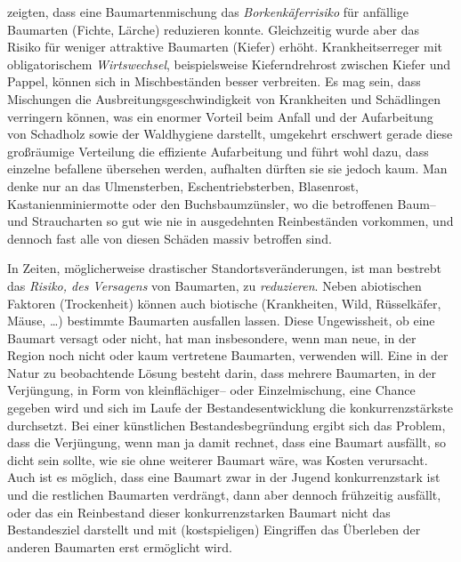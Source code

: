 \documentclass[twocolumn]{scrartcl}
\begin{document}
\cite{sylvie2021mischwaldInsekten} zeigten, dass eine
Baumartenmischung das \emph{Borkenkäferrisiko} für anfällige Baumarten
(Fichte, Lärche) reduzieren konnte. Gleichzeitig wurde aber das Risiko
für weniger attraktive Baumarten (Kiefer) erhöht. Krankheitserreger
mit obligatorischem \emph{Wirtswechsel}, beispielsweise
Kieferndrehrost zwischen Kiefer und Pappel, können sich in
Mischbeständen besser verbreiten. Es mag sein, dass Mischungen die Ausbreitungsgeschwindigkeit von Krankheiten und Schädlingen verringern können, was ein enormer Vorteil beim Anfall und der Aufarbeitung von Schadholz sowie der Waldhygiene darstellt, umgekehrt erschwert gerade diese großräumige Verteilung die effiziente Aufarbeitung und führt wohl dazu, dass einzelne befallene übersehen werden, aufhalten dürften sie sie jedoch kaum. Man denke nur an das Ulmensterben, Eschentriebsterben, Blasenrost, Kastanienminiermotte oder den Buchsbaumzünsler, wo die betroffenen Baum-- und Straucharten so gut wie nie in ausgedehnten Reinbeständen vorkommen, und dennoch fast alle von diesen Schäden massiv betroffen sind.

In Zeiten, möglicherweise drastischer Standortsveränderungen, ist man bestrebt
das \emph{Risiko, des Versagens} von Baumarten, zu \emph{reduzieren}. Neben
abiotischen Faktoren (Trockenheit) können auch biotische (Krankheiten, Wild,
Rüsselkäfer, Mäuse, \dots) bestimmte Baumarten ausfallen lassen. Diese
Ungewissheit, ob eine Baumart versagt oder nicht, hat man insbesondere, wenn man
neue, in der Region noch nicht oder kaum vertretene Baumarten, verwenden will.
Eine in der Natur zu beobachtende Lösung besteht darin, dass mehrere Baumarten,
in der Verjüngung, in Form von kleinflächiger-- oder Einzelmischung, eine Chance
gegeben wird und sich im Laufe der Bestandesentwicklung die konkurrenzstärkste
durchsetzt. Bei einer künstlichen Bestandesbegründung ergibt sich das Problem,
dass die Verjüngung, wenn man ja damit rechnet, dass eine Baumart ausfällt, so
dicht sein sollte, wie sie ohne weiterer Baumart wäre, was Kosten verursacht.
Auch ist es möglich, dass eine Baumart zwar in der Jugend konkurrenzstark ist
und die restlichen Baumarten verdrängt, dann aber dennoch frühzeitig ausfällt,
oder das ein Reinbestand dieser konkurrenzstarken Baumart nicht das
Bestandesziel darstellt und mit (kostspieligen) Eingriffen das Überleben der
anderen Baumarten erst ermöglicht wird.
\end{document}
